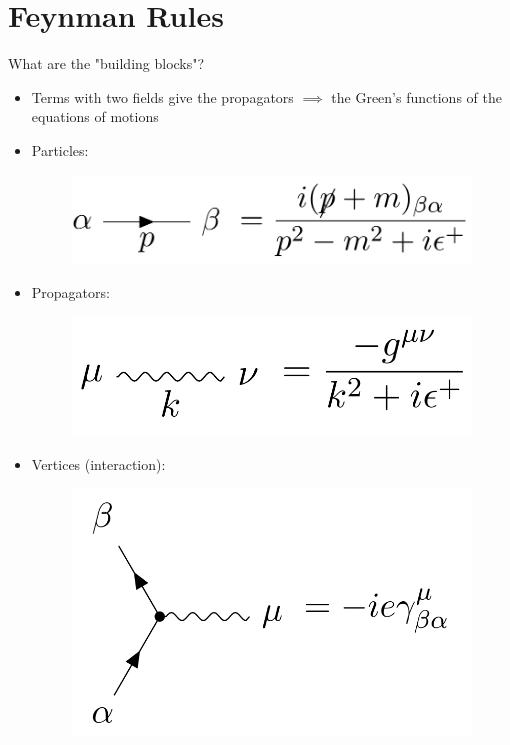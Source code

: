 \documentclass[a4paper, 11pt, normalem]{report}
\begin{document}
\section{Feynman Rules}
What are the "building blocks"?
\begin{itemize}
    \item Terms with two fields give the propagators $\implies$ the Green's functions of the equations of motions
    \item Particles:
        \begin{figure}[H]
            \centering
            \includegraphics[scale=0.2]{feyn1.png}
        \end{figure}
    \item Propagators:
        \begin{figure}[H]
            \centering
            \includegraphics[scale=0.2]{feyn2.png}
        \end{figure}
    \item Vertices (interaction):
        \begin{figure}[H]
            \centering
            \includegraphics[scale=0.2]{feyn3.png}
        \end{figure}
\end{itemize}
\end{document}
